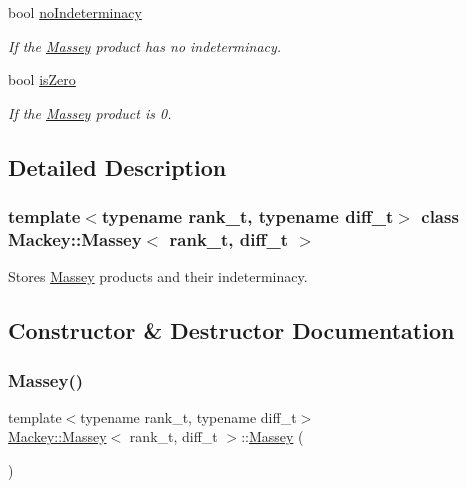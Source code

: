\begin{DoxyCompactItemize}
bool \hyperlink{classMackey_1_1Massey_a4dbd74288447b094c8308f4d68bf8cff}{no\+Indeterminacy}
\begin{DoxyCompactList}\small\item\em If the \hyperlink{classMackey_1_1Massey}{Massey} product has no indeterminacy. \end{DoxyCompactList}\item 
bool \hyperlink{classMackey_1_1Massey_a8e1b4f51835a4de55c6d10e14a607189}{is\+Zero}
\begin{DoxyCompactList}\small\item\em If the \hyperlink{classMackey_1_1Massey}{Massey} product is 0. \end{DoxyCompactList}\end{DoxyCompactItemize}


\subsection{Detailed Description}
\subsubsection*{template$<$typename rank\+\_\+t, typename diff\+\_\+t$>$\newline
class Mackey\+::\+Massey$<$ rank\+\_\+t, diff\+\_\+t $>$}

Stores \hyperlink{classMackey_1_1Massey}{Massey} products and their indeterminacy. 

\subsection{Constructor \& Destructor Documentation}
\mbox{\label{classMackey_1_1Massey_a9e48aaa79f409e96ae2051719710315c}} 
\subsubsection{\texorpdfstring{Massey()}{Massey()}\hspace{0.1cm}{\footnotesize\ttfamily [1/3]}}
{\footnotesize\ttfamily template$<$typename rank\+\_\+t, typename diff\+\_\+t$>$ \\
\hyperlink{classMackey_1_1Massey}{Mackey\+::\+Massey}$<$ rank\+\_\+t, diff\+\_\+t $>$\+::\hyperlink{classMackey_1_1Massey}{Massey} (\begin{DoxyParamCaption}{ }\end{DoxyParamCaption})\hspace{0.3cm}{\ttfamily [inline]}}



